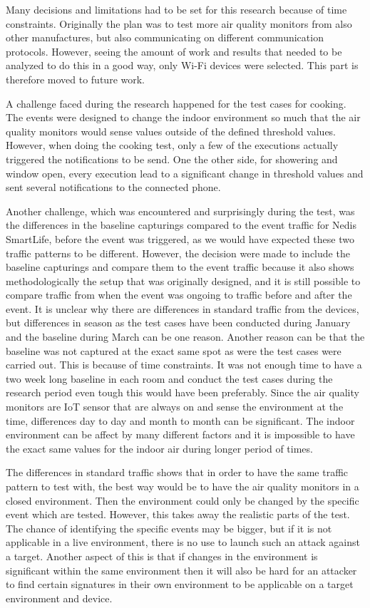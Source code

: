 Many decisions and limitations had to be set for this research because of time constraints. Originally the plan was to test more air quality monitors from also other manufactures, but also communicating on different communication protocols. However, seeing the amount of work and results that needed to be analyzed to do this in a good way, only \gls{Wi-Fi} devices were selected. This part is therefore moved to future work.  

A challenge faced during the research happened for the test cases for cooking. The events were designed to change the indoor environment so much that the air quality monitors would sense values outside of the defined threshold values. However, when doing the cooking test, only a few of the executions actually triggered the notifications to be send. One the other side, for showering and window open, every execution lead to a significant change in threshold values and sent several notifications to the connected phone. 

Another challenge, which was encountered and surprisingly during the test, was the differences in the baseline capturings compared to the event traffic for Nedis SmartLife, before the event was triggered, as we would have expected these two traffic patterns to be different. However, the decision were made to include the baseline capturings and compare them to the event traffic because it also shows methodologically the setup that was originally designed, and it is still possible to compare traffic from when the event was ongoing to traffic before and after the event. It is unclear why there are differences in standard traffic from the devices, but differences in season as the test cases have been conducted during January and the baseline during March can be one reason. Another reason can be that the baseline was not captured at the exact same spot as were the test cases were carried out. This is because of time constraints. It was not enough time to have a two week long baseline in each room and conduct the test cases during the research period even tough this would have been preferably. Since the air quality monitors are \gls{IoT} sensor that are always on and sense the environment at the time, differences day to day and month to month can be significant. The indoor environment can be affect by many different factors and it is impossible to have the exact same values for the indoor air during longer period of times. 

The differences in standard traffic shows that in order to have the same traffic pattern to test with, the best way would be to have the air quality monitors in a closed environment. Then the environment could only be changed by the specific event which are tested. However, this takes away the realistic parts of the test. The chance of identifying the specific events may be bigger, but if it is not applicable in a live environment, there is no use to launch such an attack against a target. Another aspect of this is that if changes in the environment is significant within the same environment then it will also be hard for an attacker to find certain signatures in their own environment to be applicable on a target environment and device. 